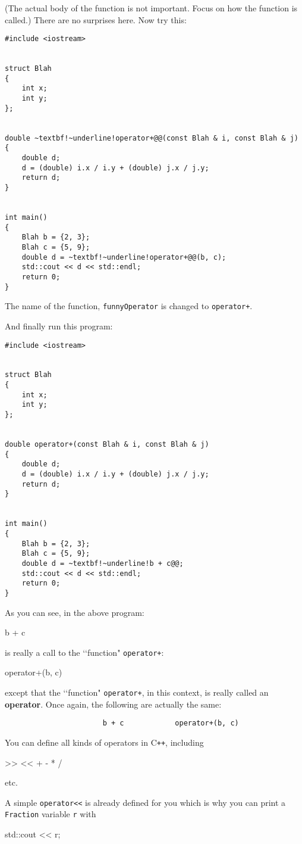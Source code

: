 (The actual body of the function is not important. Focus on how the function
is called.) There are no surprises here. Now try this:
\begin{Verbatim}[frame=single, commandchars=~!@]
#include <iostream>


struct Blah
{
    int x;
    int y;
};


double ~textbf!~underline!operator+@@(const Blah & i, const Blah & j)
{
    double d;
    d = (double) i.x / i.y + (double) j.x / j.y;
    return d;
}


int main()
{
    Blah b = {2, 3};
    Blah c = {5, 9};
    double d = ~textbf!~underline!operator+@@(b, c);
    std::cout << d << std::endl;
    return 0;
}
\end{Verbatim}
The name of the function, \verb!funnyOperator! is changed to \verb!operator+!.

And finally run this program:
\begin{Verbatim}[frame=single, commandchars=~!@]
#include <iostream>


struct Blah
{
    int x;
    int y;
};


double operator+(const Blah & i, const Blah & j)
{
    double d;
    d = (double) i.x / i.y + (double) j.x / j.y;
    return d;
}

  
int main()
{
    Blah b = {2, 3};
    Blah c = {5, 9};
    double d = ~textbf!~underline!b + c@@;
    std::cout << d << std::endl;
    return 0;
}
\end{Verbatim}

As you can see, in the above program:
\begin{console}
b + c
\end{console}
is really a call to the \lq\lq function" \verb!operator+!:
\begin{console}
 operator+(b, c)
\end{console}
except that the \lq\lq function" \verb!operator+!, in this context, is really
called an \textbf{\large operator}. Once again, the following are actually the
same:
\begin{Verbatim}
                       b + c            operator+(b, c)
\end{Verbatim}

You can define all kinds of operators in C\texttt{++}, including
\begin{console}
 >>      <<      +      -      *      /
\end{console}
etc.

A simple \verb!operator<<! is already defined for you which is why you can
print a \verb!Fraction! variable \verb!r! with
\begin{console}
std::cout << r;
\end{console}


